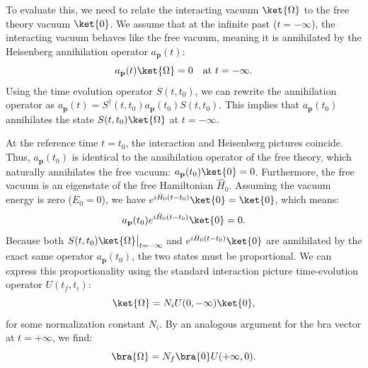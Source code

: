 To evaluate this, we need to relate the interacting vacuum \(\ket{\Omega}\) to the free theory vacuum \(\ket{0}\). We assume that at the infinite past (\(t = -\infty\)), the interacting vacuum behaves like the free vacuum, meaning it is annihilated by the Heisenberg annihilation operator \(a_{\mathbf{p}}(t)\):
\[
    a_{\mathbf{p}}(t) \ket{\Omega} = 0 \quad \text{at } t = -\infty.
\]
Using the time evolution operator \(S(t, t_0)\), we can rewrite the annihilation operator as \(a_{\mathbf{p}}(t) = S^\dagger(t, t_0) a_{\mathbf{p}}(t_0) S(t, t_0)\). This implies that \(a_{\mathbf{p}}(t_0)\) annihilates the state \(S(t, t_0) \ket{\Omega}\) at \(t = -\infty\).

At the reference time \(t = t_0\), the interaction and Heisenberg pictures coincide. Thus, \(a_{\mathbf{p}}(t_0)\) is identical to the annihilation operator of the free theory, which naturally annihilates the free vacuum: \(a_{\mathbf{p}}(t_0) \ket{0} = 0\).
Furthermore, the free vacuum is an eigenstate of the free Hamiltonian \(\hat{H}_0\). Assuming the vacuum energy is zero (\(E_0 = 0\)), we have \(e^{i \hat{H}_0 (t - t_0)} \ket{0} = \ket{0}\), which means:
\[
    a_{\mathbf{p}}(t_0) e^{i \hat{H}_0 (t - t_0)} \ket{0} = 0.
\]
Because both \(S(t, t_0)\ket{\Omega}\big|_{t = -\infty}\) and \(e^{i \hat{H}_0 (t - t_0)} \ket{0}\) are annihilated by the exact same operator \(a_{\mathbf{p}}(t_0)\), the two states must be proportional. We can express this proportionality using the standard interaction picture time-evolution operator \(U(t_f, t_i)\):
\[
    \ket{\Omega} = N_i U(0, -\infty) \ket{0},
\]
for some normalization constant \(N_i\). By an analogous argument for the bra vector at \(t = +\infty\), we find:
\[
    \bra{\Omega} = N_f \bra{0} U(+\infty, 0).
\]

